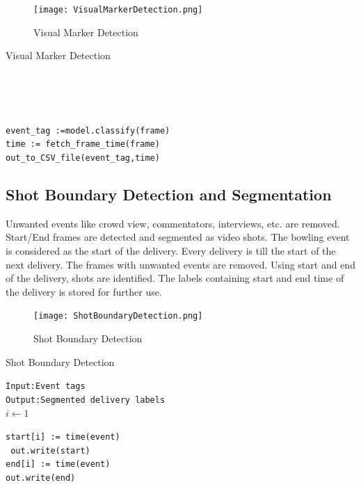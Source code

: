 \begin{figure}[h]
    \centering
   \texttt{[image: VisualMarkerDetection.png]}
    \caption{Visual Marker Detection}
    \label{fig:Visual Marker Detection}
\end{figure}
\begin{algorithm}
\caption{Visual Marker Detection}
\\
\\
\\
\begin{algorithmic}
    \State \texttt{event\_tag :=model.classify(frame)}\\
    \State \texttt{time := fetch\_frame\_time(frame)}\\
    \State \texttt{out\_to\_CSV\_file(event\_tag,time)}\\
\ENDFOR
\end{algorithmic}
\end{algorithm}

\newpage
\subsection{Shot Boundary Detection and Segmentation}
Unwanted events like crowd view, commentators, interviews, etc. are removed. Start/End frames are detected and segmented as video shots. The bowling event is considered as the start of the delivery. Every delivery is till the start of the next delivery. The frames with unwanted events are removed. Using start and end of the delivery, shots are identified. The labels containing start and end time of the delivery is stored for further use.

\begin{figure}[h]
    \centering
   \texttt{[image: ShotBoundaryDetection.png]}
    \caption{Shot Boundary Detection}
    \label{fig:ShotBoundaryDetection}
\end{figure}
\newpage
\begin{algorithm}
\caption{Shot Boundary Detection}
\State \texttt{Input:Event tags}\\
\State \texttt{Output:Segmented delivery labels}\\
\state $i \leftarrow 1$\\
\begin{algorithmic}
                 \State \texttt{start[i] := time(event)}\\
            \State \texttt{ out.write(start)}\\
             \State \texttt{end[i] := time(event)}\\
             \State \texttt{out.write(end)}\\
        \ENDIF
\ENDFOR
\end{algorithmic}
\end{algorithm}
\newpage
